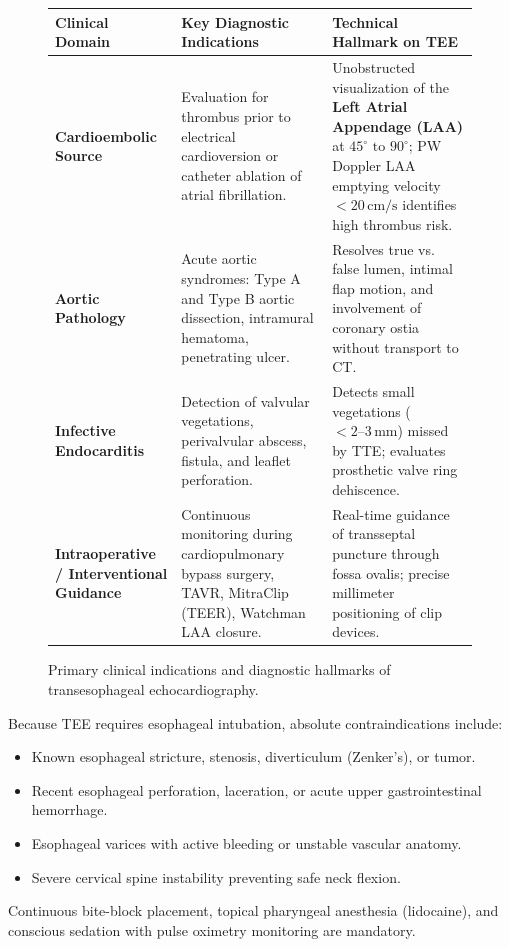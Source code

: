 \documentclass[11pt,a4paper]{article}
\begin{document}
\begin{figure}[htbp]
\centering
\setlength{\tabcolsep}{4pt}
\begin{tabular}{p{3.8cm}p{5.5cm}p{5.5cm}}
\toprule
\textbf{Clinical Domain} & \textbf{Key Diagnostic Indications} & \textbf{Technical Hallmark on TEE} \\
\midrule
\textbf{Cardioembolic Source} & Evaluation for thrombus prior to electrical cardioversion or catheter ablation of atrial fibrillation. & Unobstructed visualization of the \textbf{Left Atrial Appendage (LAA)} at $45^\circ\text{ to }90^\circ$; PW Doppler LAA emptying velocity $< 20\,\text{cm/s}$ identifies high thrombus risk. \\
\addlinespace
\textbf{Aortic Pathology} & Acute aortic syndromes: Type A and Type B aortic dissection, intramural hematoma, penetrating ulcer. & Resolves true vs. false lumen, intimal flap motion, and involvement of coronary ostia without transport to CT. \\
\addlinespace
\textbf{Infective Endocarditis} & Detection of valvular vegetations, perivalvular abscess, fistula, and leaflet perforation. & Detects small vegetations ($< 2\text{--}3\,\text{mm}$) missed by TTE; evaluates prosthetic valve ring dehiscence. \\
\addlinespace
\textbf{Intraoperative / Interventional Guidance} & Continuous monitoring during cardiopulmonary bypass surgery, TAVR, MitraClip (TEER), Watchman LAA closure. & Real-time guidance of transseptal puncture through fossa ovalis; precise millimeter positioning of clip devices. \\
\bottomrule
\end{tabular}
\caption{Primary clinical indications and diagnostic hallmarks of transesophageal echocardiography.}
\label{tab:tee_indications}
\end{figure}

\begin{clinicalpearl}
Because TEE requires esophageal intubation, absolute contraindications include:
\begin{itemize}[leftmargin=*]
    \item Known esophageal stricture, stenosis, diverticulum (Zenker's), or tumor.
    \item Recent esophageal perforation, laceration, or acute upper gastrointestinal hemorrhage.
    \item Esophageal varices with active bleeding or unstable vascular anatomy.
    \item Severe cervical spine instability preventing safe neck flexion.
\end{itemize}
Continuous bite-block placement, topical pharyngeal anesthesia (lidocaine), and conscious sedation with pulse oximetry monitoring are mandatory.
\end{clinicalpearl}
\end{document}
